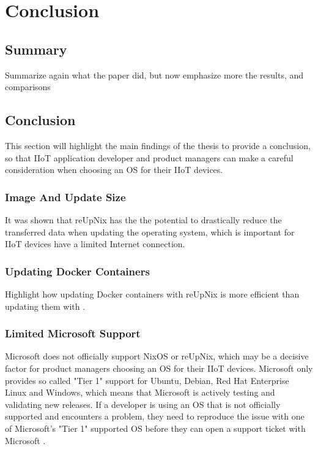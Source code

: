 \chapter{Conclusion}

\section{Summary}
\begin{tcolorbox}[title=TODO]
Summarize again what the paper did, but now emphasize more the results, and comparisons
\end{tcolorbox}

\section{Conclusion}
This section will highlight the main findings of the thesis to provide a
conclusion, so that \ac{IIoT} application developer and product managers can
make a careful consideration when choosing an \ac{OS} for their \ac{IIoT} devices.

\subsection{Image And Update Size}
It was shown that reUpNix has the the potential to drastically reduce the transferred
data when updating the operating system, which is important for \ac{IIoT} devices
have a limited Internet connection.

\subsection{Updating Docker Containers}

\begin{tcolorbox}[title=TODO]
    Highlight how updating Docker containers with reUpNix is more efficient than
    updating them with .
\end{tcolorbox}

\subsection{Limited Microsoft Support}
Microsoft does not officially support NixOS or reUpNix, which may be a decisive factor
for product managers choosing an \ac{OS} for their \ac{IIoT} devices. Microsoft
only provides so called "Tier 1" support for Ubuntu, Debian, Red Hat Enterprise
Linux and Windows, which means that Microsoft is actively testing and validating
new releases. If a developer is using an \ac{OS} that is not officially supported
and encounters a problem, they need to reproduce the issue with one of Microsoft's
"Tier 1" supported \ac{OS} before they can open a support ticket with Microsoft
\cite{msdoc-supportetplatforms}.

